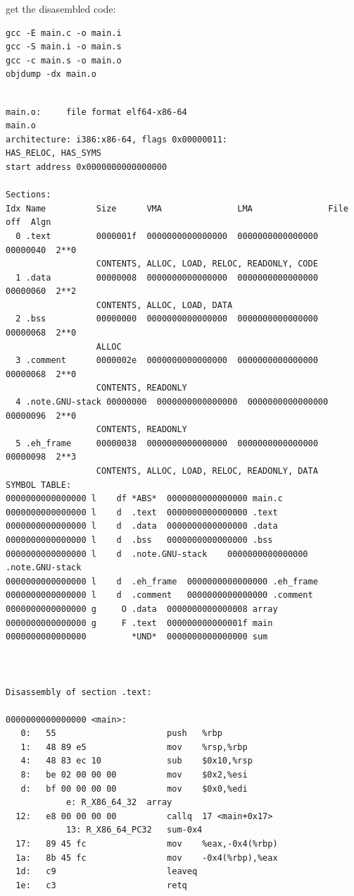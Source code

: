 \documentclass[11pt]{article}
\begin{document}
get the disasembled code:\\
\begin{verbatim}
gcc -E main.c -o main.i
gcc -S main.i -o main.s
gcc -c main.s -o main.o
objdump -dx main.o
\end{verbatim}

\begin{verbatim}

main.o:     file format elf64-x86-64
main.o
architecture: i386:x86-64, flags 0x00000011:
HAS_RELOC, HAS_SYMS
start address 0x0000000000000000

Sections:
Idx Name          Size      VMA               LMA               File off  Algn
  0 .text         0000001f  0000000000000000  0000000000000000  00000040  2**0
                  CONTENTS, ALLOC, LOAD, RELOC, READONLY, CODE
  1 .data         00000008  0000000000000000  0000000000000000  00000060  2**2
                  CONTENTS, ALLOC, LOAD, DATA
  2 .bss          00000000  0000000000000000  0000000000000000  00000068  2**0
                  ALLOC
  3 .comment      0000002e  0000000000000000  0000000000000000  00000068  2**0
                  CONTENTS, READONLY
  4 .note.GNU-stack 00000000  0000000000000000  0000000000000000  00000096  2**0
                  CONTENTS, READONLY
  5 .eh_frame     00000038  0000000000000000  0000000000000000  00000098  2**3
                  CONTENTS, ALLOC, LOAD, RELOC, READONLY, DATA
SYMBOL TABLE:
0000000000000000 l    df *ABS*	0000000000000000 main.c
0000000000000000 l    d  .text	0000000000000000 .text
0000000000000000 l    d  .data	0000000000000000 .data
0000000000000000 l    d  .bss	0000000000000000 .bss
0000000000000000 l    d  .note.GNU-stack	0000000000000000 .note.GNU-stack
0000000000000000 l    d  .eh_frame	0000000000000000 .eh_frame
0000000000000000 l    d  .comment	0000000000000000 .comment
0000000000000000 g     O .data	0000000000000008 array
0000000000000000 g     F .text	000000000000001f main
0000000000000000         *UND*	0000000000000000 sum



Disassembly of section .text:

0000000000000000 <main>:
   0:	55                   	push   %rbp
   1:	48 89 e5             	mov    %rsp,%rbp
   4:	48 83 ec 10          	sub    $0x10,%rsp
   8:	be 02 00 00 00       	mov    $0x2,%esi
   d:	bf 00 00 00 00       	mov    $0x0,%edi
			e: R_X86_64_32	array
  12:	e8 00 00 00 00       	callq  17 <main+0x17>
			13: R_X86_64_PC32	sum-0x4
  17:	89 45 fc             	mov    %eax,-0x4(%rbp)
  1a:	8b 45 fc             	mov    -0x4(%rbp),%eax
  1d:	c9                   	leaveq 
  1e:	c3                   	retq   
\end{verbatim}
\end{document}
